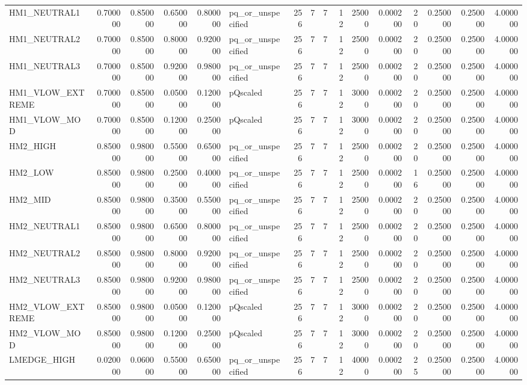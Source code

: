 \begin{longtable}{lrrrrlrrrrrrrrrr}
HM1_NEUTRAL1 & 0.700000 & 0.850000 & 0.650000 & 0.800000 & pq_or_unspecified & 256 & 7 & 7 & 12 & 25000 & 0.000200 & 20 & 0.250000 & 0.250000 & 4.000000 \\
HM1_NEUTRAL2 & 0.700000 & 0.850000 & 0.800000 & 0.920000 & pq_or_unspecified & 256 & 7 & 7 & 12 & 25000 & 0.000200 & 20 & 0.250000 & 0.250000 & 4.000000 \\
HM1_NEUTRAL3 & 0.700000 & 0.850000 & 0.920000 & 0.980000 & pq_or_unspecified & 256 & 7 & 7 & 12 & 25000 & 0.000200 & 20 & 0.250000 & 0.250000 & 4.000000 \\
HM1_VLOW_EXTREME & 0.700000 & 0.850000 & 0.050000 & 0.120000 & pQscaled & 256 & 7 & 7 & 12 & 30000 & 0.000200 & 20 & 0.250000 & 0.250000 & 4.000000 \\
HM1_VLOW_MOD & 0.700000 & 0.850000 & 0.120000 & 0.250000 & pQscaled & 256 & 7 & 7 & 12 & 30000 & 0.000200 & 20 & 0.250000 & 0.250000 & 4.000000 \\
HM2_HIGH & 0.850000 & 0.980000 & 0.550000 & 0.650000 & pq_or_unspecified & 256 & 7 & 7 & 12 & 25000 & 0.000200 & 20 & 0.250000 & 0.250000 & 4.000000 \\
HM2_LOW & 0.850000 & 0.980000 & 0.250000 & 0.400000 & pq_or_unspecified & 256 & 7 & 7 & 12 & 25000 & 0.000200 & 16 & 0.250000 & 0.250000 & 4.000000 \\
HM2_MID & 0.850000 & 0.980000 & 0.350000 & 0.550000 & pq_or_unspecified & 256 & 7 & 7 & 12 & 25000 & 0.000200 & 20 & 0.250000 & 0.250000 & 4.000000 \\
HM2_NEUTRAL1 & 0.850000 & 0.980000 & 0.650000 & 0.800000 & pq_or_unspecified & 256 & 7 & 7 & 12 & 25000 & 0.000200 & 20 & 0.250000 & 0.250000 & 4.000000 \\
HM2_NEUTRAL2 & 0.850000 & 0.980000 & 0.800000 & 0.920000 & pq_or_unspecified & 256 & 7 & 7 & 12 & 25000 & 0.000200 & 20 & 0.250000 & 0.250000 & 4.000000 \\
HM2_NEUTRAL3 & 0.850000 & 0.980000 & 0.920000 & 0.980000 & pq_or_unspecified & 256 & 7 & 7 & 12 & 25000 & 0.000200 & 20 & 0.250000 & 0.250000 & 4.000000 \\
HM2_VLOW_EXTREME & 0.850000 & 0.980000 & 0.050000 & 0.120000 & pQscaled & 256 & 7 & 7 & 12 & 30000 & 0.000200 & 20 & 0.250000 & 0.250000 & 4.000000 \\
HM2_VLOW_MOD & 0.850000 & 0.980000 & 0.120000 & 0.250000 & pQscaled & 256 & 7 & 7 & 12 & 30000 & 0.000200 & 20 & 0.250000 & 0.250000 & 4.000000 \\
LMEDGE_HIGH & 0.020000 & 0.060000 & 0.550000 & 0.650000 & pq_or_unspecified & 256 & 7 & 7 & 12 & 40000 & 0.000200 & 25 & 0.250000 & 0.250000 & 4.000000 \\

\end{longtable}
